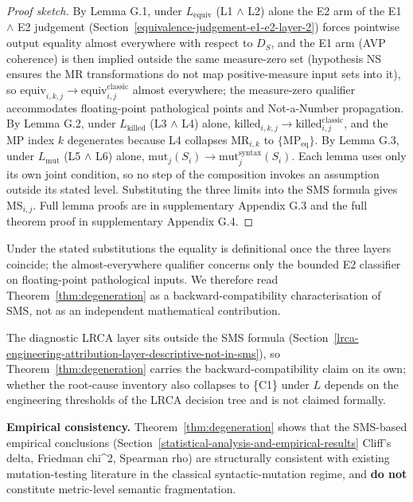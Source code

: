 \documentclass[manuscript,screen,review]{acmart}
\begin{document}
\begin{proof}[Proof sketch]
By Lemma G.1, under $L_{\mathrm{equiv}}$ (L1 $\wedge$ L2) alone the E2 arm
of the E1 $\wedge$ E2 judgement (Section~\ref{equivalence-judgement-e1-e2-layer-2})
forces pointwise output equality almost everywhere with respect to
$D_S$, and the E1 arm (AVP coherence) is then implied outside the same
measure-zero set (hypothesis NS ensures the MR transformations do not map
positive-measure input sets into it), so
$\mathrm{equiv}_{i,k,j} \to \mathrm{equiv}_{i,j}^{\mathrm{classic}}$
almost everywhere; the measure-zero qualifier accommodates
floating-point pathological points and Not-a-Number propagation. By
Lemma G.2, under $L_{\mathrm{killed}}$ (L3 $\wedge$ L4) alone,
$\mathrm{killed}_{i,k,j} \to \mathrm{killed}_{i,j}^{\mathrm{classic}}$,
and the MP index $k$ degenerates because L4 collapses
$\mathrm{MR}_{i,k}$ to $\{\mathrm{MP}_{\mathrm{eq}}\}$. By Lemma G.3,
under $L_{\mathrm{mut}}$ (L5 $\wedge$ L6) alone,
$\mathrm{mut}_j(S_i) \to \mathrm{mut}_j^{\mathrm{syntax}}(S_i)$. Each
lemma uses only its own joint condition, so no step of the composition
invokes an assumption outside its stated level. Substituting the three
limits into the SMS formula gives $\mathrm{MS}_{i,j}$. Full lemma
proofs are in supplementary Appendix G.3 and the full theorem proof in
supplementary Appendix G.4.
\end{proof}

Under the stated substitutions the equality is definitional once the
three layers coincide; the almost-everywhere qualifier concerns only
the bounded E2 classifier on floating-point pathological inputs. We
therefore read Theorem~\ref{thm:degeneration} as a
backward-compatibility characterisation of SMS, not as an independent
mathematical contribution.

The diagnostic LRCA layer sits outside the SMS formula
(Section~\ref{lrca-engineering-attribution-layer-descriptive-not-in-sms}),
so Theorem~\ref{thm:degeneration} carries the backward-compatibility
claim on its own; whether the root-cause inventory also collapses to
\{C1\} under $L$ depends on the engineering thresholds of the LRCA
decision tree and is not claimed formally.

\textbf{Empirical consistency.} Theorem~\ref{thm:degeneration}
shows that the SMS-based empirical conclusions (Section~\ref{statistical-analysis-and-empirical-results} Cliff's delta,
Friedman chi\^{}2, Spearman rho) are structurally consistent with
existing mutation-testing literature in the classical syntactic-mutation
regime, and \textbf{do not} constitute metric-level semantic
fragmentation.
\end{document}
